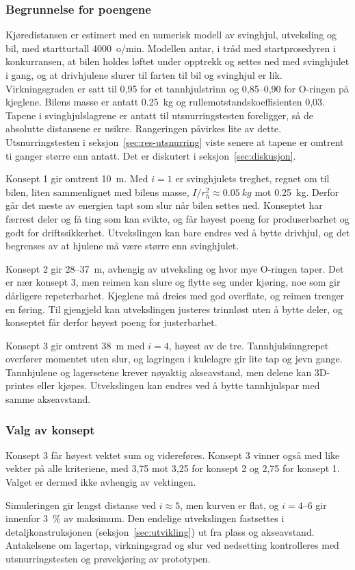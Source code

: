 \subsubsection{Begrunnelse for poengene}
Kjøredistansen er estimert med en numerisk modell av svinghjul, utveksling og bil, med startturtall \SI{4000}{o/min}. Modellen antar, i tråd med startprosedyren i konkurransen, at bilen holdes løftet under opptrekk og settes ned med svinghjulet i gang, og at drivhjulene slurer til farten til bil og svinghjul er lik. Virkningsgraden er satt til 0,95 for et tannhjulstrinn og 0,85--0,90 for O-ringen på kjeglene. Bilens masse er antatt \SI{0,25}{kg} og rullemotstandskoeffisienten 0,03. Tapene i svinghjulslagrene er antatt til utsnurringstesten foreligger, så de absolutte distansene er usikre. Rangeringen påvirkes lite av dette. Utsnurringstesten i seksjon~\ref{sec:res-utsnurring} viste senere at tapene er omtrent ti ganger større enn antatt. Det er diskutert i seksjon~\ref{sec:diskusjon}.

Konsept 1 gir omtrent \SI{10}{m}. Med $i = 1$ er svinghjulets treghet, regnet om til bilen, liten sammenlignet med bilens masse, $I/r_h^2 \approx \SI{0,05}{kg}$ mot \SI{0,25}{kg}. Derfor går det meste av energien tapt som slur når bilen settes ned. Konseptet har færrest deler og få ting som kan svikte, og får høyest poeng for produserbarhet og godt for driftssikkerhet. Utvekslingen kan bare endres ved å bytte drivhjul, og det begrenses av at hjulene må være større enn svinghjulet.

Konsept 2 gir 28--\SI{37}{m}, avhengig av utveksling og hvor mye O-ringen taper. Det er nær konsept 3, men reimen kan slure og flytte seg under kjøring, noe som gir dårligere repeterbarhet. Kjeglene må dreies med god overflate, og reimen trenger en føring. Til gjengjeld kan utvekslingen justeres trinnløst uten å bytte deler, og konseptet får derfor høyest poeng for justerbarhet.

Konsept 3 gir omtrent \SI{38}{m} med $i = 4$, høyest av de tre. Tannhjulsinngrepet overfører momentet uten slur, og lagringen i kulelagre gir lite tap og jevn gange. Tannhjulene og lagersetene krever nøyaktig akseavstand, men delene kan 3D-printes eller kjøpes. Utvekslingen kan endres ved å bytte tannhjulspar med samme akseavstand.

\subsubsection{Valg av konsept}
Konsept 3 får høyest vektet sum og videreføres. Konsept 3 vinner også med like vekter på alle kriteriene, med 3,75 mot 3,25 for konsept 2 og 2,75 for konsept 1. Valget er dermed ikke avhengig av vektingen.

Simuleringen gir lengst distanse ved $i \approx 5$, men kurven er flat, og $i = 4$--$6$ gir innenfor \SI{3}{\percent} av maksimum. Den endelige utvekslingen fastsettes i detaljkonstruksjonen (seksjon~\ref{sec:utvikling}) ut fra plass og akseavstand. Antakelsene om lagertap, virkningsgrad og slur ved nedsetting kontrolleres med utsnurringstesten og prøvekjøring av prototypen.
